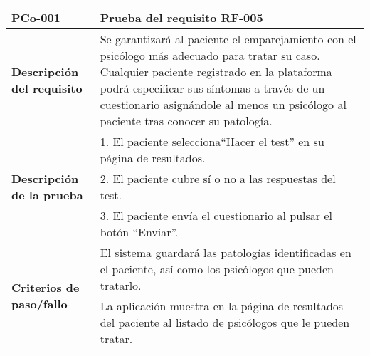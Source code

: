 \begin{table}[htpb]
\centering
\begin{tabularx}{\textwidth}{|l|X|}
\hline
\rowcolor[gray]{0.9}\textbf{PCo-001}                                     & \textbf{Prueba del requisito RF-005}                                                                                                                                                                                                                                               \\ \hline
\textbf{Descripción del requisito}                 & Se garantizará al paciente el emparejamiento con el psicólogo más adecuado para tratar su caso. Cualquier paciente registrado en la plataforma podrá especificar sus síntomas a través de un cuestionario asignándole al menos un psicólogo al paciente tras conocer su patología. \\ \hline
\multirow{3}{*}{\textbf{Descripción de la prueba}} & 1. El paciente selecciona``Hacer el test'' en su página de resultados.                                                                                                                                                                                                              \\ \cline{2-2} 
                                                   & 2. El paciente cubre sí o no a las respuestas del test.                                                                                                                                                                                                                            \\ \cline{2-2} 
                                                   & 3. El paciente envía el cuestionario al pulsar el botón ``Enviar''.                                                                                                                                                                                                                  \\ \hline
\multirow{2}{*}{\textbf{Criterios de paso/fallo}}  & El sistema guardará las patologías identificadas en el paciente, así como los psicólogos que pueden tratarlo.                                                                                                                                                                      \\ \cline{2-2} 
                                                   & La aplicación muestra en la página de resultados del paciente al listado de psicólogos que le pueden tratar.                                                                                                                                                                       \\ \hline

\end{tabularx}
\end{table}
